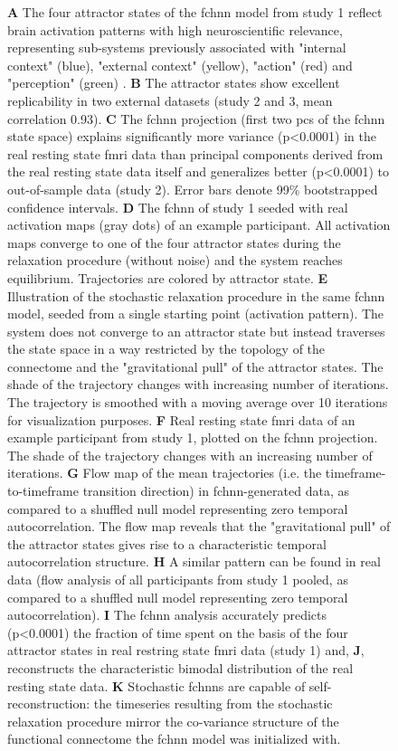 \documentclass{article}
\begin{document}
\begin{figure}[!htbp]
{\textbf{A} The four attractor states of the \acrshort{fchnn} model from study 1 reflect brain activation
patterns with high neuroscientific relevance, representing sub-systems previously associated with "internal context"
(blue), "external context" (yellow), "action" (red) and "perception" (green)
\citep{golland2008data, cioli2014differences, chen2018human, fuster2004upper, margulies2016situating}.
\textbf{B} The attractor states show excellent replicability in two external datasets (study 2 and 3, mean correlation 0.93).
\textbf{C} The \acrshort{fchnn} projection (first two \acrshort{pc}s of the \acrshort{fchnn} state space) explains significantly more variance (p\textless 0.0001) in the real
resting state \acrshort{fmri} data than principal components derived from the real resting state data itself and generalizes
better (p\textless 0.0001) to out-of-sample data (study 2). Error bars denote 99\% bootstrapped confidence intervals.
\textbf{D} The \acrshort{fchnn} of study 1 seeded with real activation maps (gray dots) of an example participant. All activation maps converge to one of the four attractor states during the relaxation procedure (without noise) and the system reaches equilibrium. Trajectories are colored by attractor state.
\textbf{E} Illustration of the stochastic relaxation procedure in the same \acrshort{fchnn} model, seeded from a single starting point (activation pattern). The system does not converge to an attractor state but instead traverses the state space in a way restricted by the topology of the connectome and the "gravitational pull" of the attractor states. The shade of the trajectory changes with increasing number of iterations. The trajectory is smoothed with a moving average over 10 iterations for visualization purposes.
\textbf{F} Real resting state \acrshort{fmri} data of an example participant from study 1, plotted on the \acrshort{fchnn} projection. The shade of the trajectory changes with an increasing number of iterations.
\textbf{G} Flow map of the mean trajectories (i.e. the timeframe-to-timeframe transition direction) in \acrshort{fchnn}-generated data, as compared to a shuffled null model representing zero temporal autocorrelation. The flow map reveals that the "gravitational pull" of the attractor states gives rise to a characteristic temporal autocorrelation structure.
\textbf{H} A similar pattern can be found in real data (flow analysis of all participants from study 1 pooled, as compared to a shuffled null model representing zero temporal autocorrelation).
\textbf{I} The \acrshort{fchnn} analysis accurately predicts (p\textless 0.0001) the fraction of time spent on the basis of the four attractor
states in real restring state \acrshort{fmri} data (study 1) and,
\textbf{J}, reconstructs the characteristic bimodal distribution of the real resting state data.
\textbf{K} Stochastic \acrshort{fchnn}s are capable of self-reconstruction: the timeseries resulting from the stochastic relaxation procedure
mirror the co-variance structure of the functional connectome the \acrshort{fchnn} model was initialized with.}
\label{rest-validity}
\end{figure}
\end{document}
